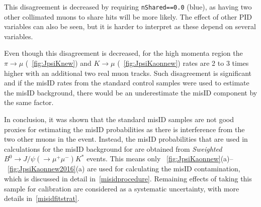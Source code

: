 
This disagreement is decreased by requiring \texttt{nShared==0.0} (blue), as having two other collimated muons to share hits will be more likely. The effect of other \gls{PID} variables can also be seen, but it is harder to interpret as these depend on several variables.

Even though this disagreement is decreased, for the high momenta region the $\pi \rightarrow \mu$ (~\autoref{fig:JpsiKnew}) and $K \rightarrow \mu$ (~\autoref{fig:JpsiKaonnew}) rates are 2 to 3 times higher with an additional two real muon tracks. Such disagreement is significant and if the misID rates from the standard control samples were used to estimate the misID background, there would be an underestimate the misID component by the same factor.

In conclusion, it was shown that the standard misID samples are not good proxies for estimating the misID probabilities as there is interference from the two other muons in the event. Instead, the misID probabilities that are used in calculations for the misID background for \Bmumumu are obtained from \textit{Sweighted} $B^{0} \rightarrow J/\psi(\rightarrow \mu^{+} \mu^{-}) K^{*}$ events. This means only ~\autoref{fig:JpsiKaonnew}(a)--~\autoref{fig:JpsiKaonnew2016}(a) are used for calculating the misID contamination, which is discussed in detail in~\autoref{misidprocedure}. Remaining effects of taking this sample for calibration are considered as a systematic uncertainty, with more details in~\autoref{misidfitstrat}.



